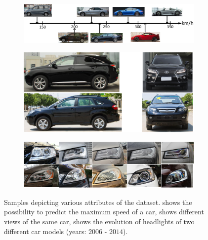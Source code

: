 \begin{figure}[t]
    \centering
    \begin{subfigure}[b]{0.75\textwidth}
        \centering
        \includegraphics[width=\textwidth]{figures/datasets/compcars_speed.pdf}
        \caption[]{}
    \end{subfigure}
    \begin{subfigure}[b]{0.4\textwidth}
        \centering
        \includegraphics[width=\textwidth]{figures/datasets/compcars_side_front_views.pdf}
        \caption[]{}
    \end{subfigure}
    \hfill
    \begin{subfigure}[b]{0.4\textwidth}
        \centering
        \includegraphics[width=\textwidth]{figures/datasets/compcars_headlights.pdf}
        \caption[]{}
    \end{subfigure}
    \caption[Attributes of the  dataset]{Samples depicting various attributes of the  dataset.  shows the possibility to predict the maximum speed of a car,  shows different views of the same car,  shows the evolution of headlights of two different car models (years: $2006$ - $2014$). }
    \label{fig:CompCarsDatasetAttributes}
\end{figure}

